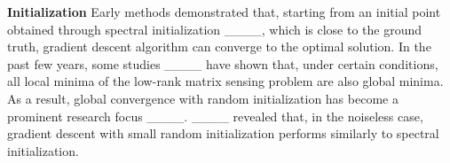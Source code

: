 
\textbf{Initialization} Early methods demonstrated that, starting from an initial point obtained through spectral initialization ____, which is close to the ground truth, gradient descent algorithm can converge to the optimal solution. In the past few years, some studies ____ have shown that, under certain conditions, all local minima of the low-rank matrix sensing problem are also global minima. As a result, global convergence with random initialization has become a prominent research focus ____. ____ revealed that, in the noiseless case, gradient descent with small random initialization performs similarly to spectral initialization.